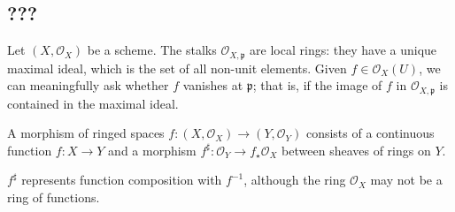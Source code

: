 \subsection{???}
Let \( (X, \mathcal O_X) \) be a scheme.
The stalks \( \mathcal O_{X,\mathfrak p} \) are local rings: they have a unique maximal ideal, which is the set of all non-unit elements.
Given \( f \in \mathcal O_X(U) \), we can meaningfully ask whether \( f \) vanishes at \( \mathfrak p \); that is, if the image of \( f \) in \( \mathcal O_{X, \mathfrak p} \) is contained in the maximal ideal.
\begin{definition}
    A morphism of ringed spaces \( f : (X, \mathcal O_X) \to (Y, \mathcal O_Y) \) consists of a continuous function \( f : X \to Y \) and a morphism \( f^\sharp : \mathcal O_Y \to f_\star \mathcal O_X \) between sheaves of rings on \( Y \).
\end{definition}
\( f^\sharp \) represents function composition with \( f^{-1} \), although the ring \( \mathcal O_X \) may not be a ring of functions.
